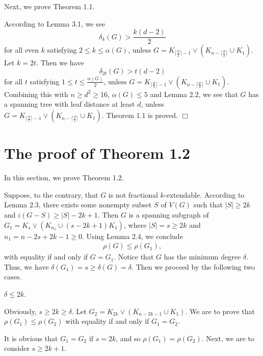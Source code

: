 \documentclass[10pt]{article}
\numberwithin{equation}{section}
\begin{document}
\medskip

Next, we prove Theorem 1.1.

\medskip

 According to Lemma 3.1, we see
$$
\delta_k(G)>\frac{k(d-2)}{2}
$$
for all even $k$ satisfying $2\leq k\leq\alpha(G)$, unless $G=K_{\lceil\frac{d}{2}\rceil-1}\vee(K_{n-\lceil\frac{d}{2}\rceil}\cup K_1)$. Let
$k=2t$. Then we have
$$
\delta_{2t}(G)>t(d-2)
$$
for all $t$ satisfying $1\leq t\leq\frac{\alpha(G)}{2}$, unless $G=K_{\lceil\frac{d}{2}\rceil-1}\vee(K_{n-\lceil\frac{d}{2}\rceil}\cup K_1)$.
Combining this with $n\geq d^{2}\geq16$, $\alpha(G)\leq5$ and Lemma 2.2, we see that $G$ has a spanning tree with leaf distance at least $d$,
unless $G=K_{\lceil\frac{d}{2}\rceil-1}\vee(K_{n-\lceil\frac{d}{2}\rceil}\cup K_1)$. Theorem 1.1 is proved. \hfill $\Box$


\section{The proof of Theorem 1.2}

In this section, we prove Theorem 1.2.

\medskip

 Suppose, to the contrary, that $G$ is not fractional $k$-extendable. According to Lemma 2.3, there exists
some nonempty subset $S$ of $V(G)$ such that $|S|\geq2k$ and $i(G-S)\geq|S|-2k+1$. Then $G$ is a spanning subgraph of
$G_1=K_s\vee(K_{n_1}\cup(s-2k+1)K_1)$, where $|S|=s\geq2k$ and $n_1=n-2s+2k-1\geq0$. Using Lemma 2.4, we conclude
\begin{align}\label{eq:4.1}
\rho(G)\leq\rho(G_1),
\end{align}
with equality if and only if $G=G_1$. Notice that $G$ has the minimum degree $\delta$. Thus, we have $\delta(G_1)=s\geq\delta(G)=\delta$. Then
we proceed by the following two cases.

\medskip

 $\delta\leq2k$.

Obviously, $s\geq2k\geq\delta$. Let $G_2=K_{2k}\vee(K_{n-2k-1}\cup K_1)$. We are to prove that $\rho(G_1)\leq\rho(G_2)$ with equality if and only
if $G_1=G_2$.

It is obvious that $G_1=G_2$ if $s=2k$, and so $\rho(G_1)=\rho(G_2)$. Next, we are to consider $s\geq2k+1$.
\end{document}
